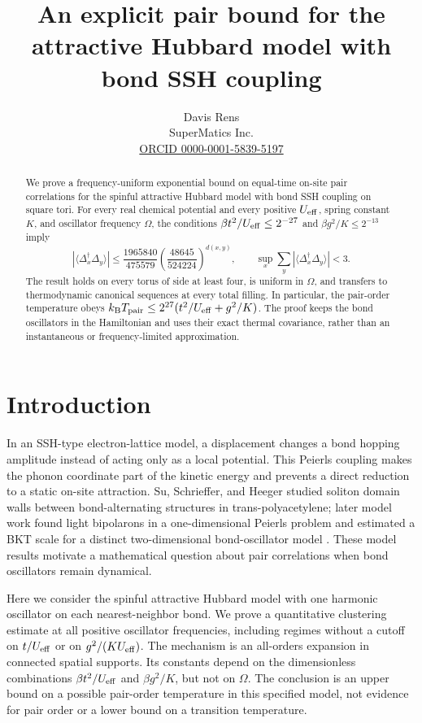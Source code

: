 \documentclass[11pt]{article}
\title{An explicit pair bound for the attractive Hubbard model with bond SSH coupling}
\author{Davis Rens\\SuperMatics Inc.\\\href{https://orcid.org/0000-0001-5839-5197}{ORCID 0000-0001-5839-5197}}
\date{\smash{\parbox{.98\linewidth}{\centering\scriptsize
Article DOI: \href{https://doi.org/10.5281/zenodo.24406987}{\PAPERDOI}\quad Supplement DOI: \href{https://doi.org/10.5281/zenodo.24406989}{\SUPPDOI}\\
Source repository: \expandafter\url\expandafter{\REPOURL}
}}}
\newcommand{\Deltaop}{\Delta}
\begin{document}
\maketitle

\begin{abstract}
We prove a frequency-uniform exponential bound on equal-time on-site pair correlations for the spinful attractive Hubbard model with bond SSH coupling on square tori. For every real chemical potential and every positive $U_{\rm eff}$, spring constant $K$, and oscillator frequency $\Omega$, the conditions $\beta t^2/U_{\rm eff}\le 2^{-27}$ and $\beta g^2/K\le 2^{-13}$ imply
\[
\left|\langle\Deltaop_x^\dagger\Deltaop_y\rangle\right|
\le \frac{1965840}{475579}\left(\frac{48645}{524224}\right)^{d(x,y)},
\qquad
\sup_x\sum_y\left|\langle\Deltaop_x^\dagger\Deltaop_y\rangle\right|<3.
\]
The result holds on every torus of side at least four, is uniform in $\Omega$, and transfers to thermodynamic canonical sequences at every total filling. In particular, the pair-order temperature obeys $k_{\rm B}T_{\rm pair}\le 2^{27}(t^2/U_{\rm eff}+g^2/K)$. The proof keeps the bond oscillators in the Hamiltonian and uses their exact thermal covariance, rather than an instantaneous or frequency-limited approximation.
\end{abstract}

\section{Introduction}

In an SSH-type electron-lattice model, a displacement changes a bond hopping amplitude instead of acting only as a local potential. This Peierls coupling makes the phonon coordinate part of the kinetic energy and prevents a direct reduction to a static on-site attraction. Su, Schrieffer, and Heeger studied soliton domain walls between bond-alternating structures in trans-polyacetylene; later model work found light bipolarons in a one-dimensional Peierls problem and estimated a BKT scale for a distinct two-dimensional bond-oscillator model \cite{su,sous,zhang}. These model results motivate a mathematical question about pair correlations when bond oscillators remain dynamical.

Here we consider the spinful attractive Hubbard model with one harmonic oscillator on each nearest-neighbor bond. We prove a quantitative clustering estimate at all positive oscillator frequencies, including regimes without a cutoff on $t/U_{\rm eff}$ or on $g^2/(K U_{\rm eff})$. The mechanism is an all-orders expansion in connected spatial supports. Its constants depend on the dimensionless combinations $\beta t^2/U_{\rm eff}$ and $\beta g^2/K$, but not on $\Omega$. The conclusion is an upper bound on a possible pair-order temperature in this specified model, not evidence for pair order or a lower bound on a transition temperature.
\end{document}
